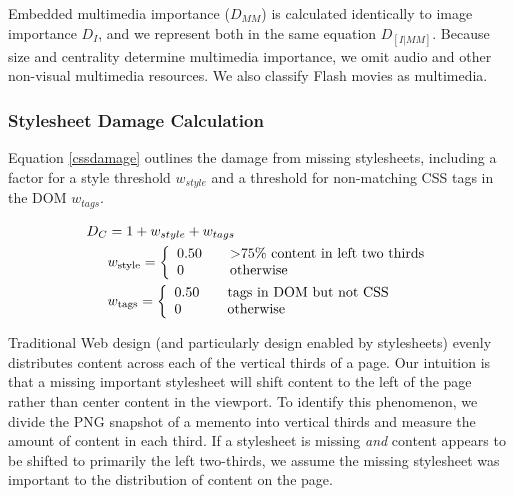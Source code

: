 Embedded multimedia importance ($D_{MM}$) is calculated identically to image importance $D_I$, and we represent both in the same equation $D_{[I|MM]}$. Because size and centrality determine multimedia importance, we omit audio and other non-visual multimedia resources. We also classify Flash movies as multimedia.


\subsubsection{Stylesheet Damage Calculation}
Equation \ref{cssdamage} outlines the damage from missing stylesheets, including a factor for a style threshold $w_{style}$ and a threshold for non-matching CSS tags in the DOM $w_{tags}$. 


\begin{equation}
\label{cssdamage}
\begin{split}
D_C &= 1 + w_{style} + w_{tags}\\
&w_{\text{style}} =  \left\{
  \begin{array}{l l}
    0.50 & \quad \text{\textgreater 75\% content in left two thirds}\\
    0    & \quad \text{otherwise}
  \end{array} \right.\\
&w_{\text{tags}} =  \left\{
  \begin{array}{l l}
    0.50 & \quad \text{tags in DOM but not CSS}\\
    0    & \quad \text{otherwise}
  \end{array} \right.
\end{split}
\end{equation}


Traditional Web design (and particularly design enabled by stylesheets) evenly distributes content across each of the vertical thirds of a page. Our intuition is that a missing important stylesheet will shift content to the left of the page rather than center content in the viewport. To identify this phenomenon, we divide the PNG snapshot of a memento into vertical thirds and measure the amount of content in each third. If a stylesheet is missing \emph{and} content appears to be shifted to primarily the left two-thirds, we assume the missing stylesheet was important to the distribution of content on the page.

